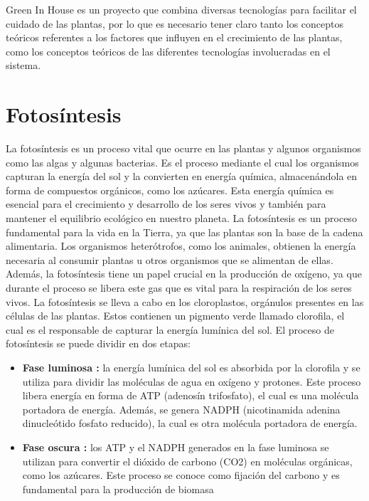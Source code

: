 
Green In House es un proyecto que combina diversas tecnologías para facilitar el cuidado de las plantas, por lo que es necesario tener claro tanto los conceptos teóricos referentes a los factores que influyen en el crecimiento de las plantas, como los conceptos teóricos de las diferentes tecnologías involucradas en el sistema.

\section{Fotosíntesis}
La fotosíntesis \cite{wiki:fotosíntesis} es un proceso vital que ocurre en las plantas y algunos organismos como las algas y algunas bacterias. Es el proceso mediante el cual los organismos capturan la energía del sol y la convierten en energía química, almacenándola en forma de compuestos orgánicos, como los azúcares. Esta energía química es esencial para el crecimiento y desarrollo de los seres vivos y también para mantener el equilibrio ecológico en nuestro planeta.
La fotosíntesis es un proceso fundamental para la vida en la Tierra, ya que las plantas son la base de la cadena alimentaria. Los organismos heterótrofos, como los animales, obtienen la energía necesaria al consumir plantas u otros organismos que se alimentan de ellas. Además, la fotosíntesis tiene un papel crucial en la producción de oxígeno, ya que durante el proceso se libera este gas que es vital para la respiración de los seres vivos.
La fotosíntesis se lleva a cabo en los cloroplastos, orgánulos presentes en las células de las plantas. Estos contienen un pigmento verde llamado clorofila, el cual es el responsable de capturar la energía lumínica del sol. El proceso de fotosíntesis se puede dividir en dos etapas: 
\begin{itemize}
    \item \textbf{Fase luminosa \cite{wiki:fase_luminosa}:} la energía lumínica del sol es absorbida por la clorofila y se utiliza para dividir las moléculas de agua en oxígeno y protones. Este proceso libera energía en forma de ATP (adenosín trifosfato), el cual es una molécula portadora de energía. Además, se genera NADPH (nicotinamida adenina dinucleótido fosfato reducido), la cual es otra molécula portadora de energía.
    \item \textbf{Fase oscura \cite{wiki:fase_oscura}:} los ATP y el NADPH generados en la fase luminosa se utilizan para convertir el dióxido de carbono (CO2) en moléculas orgánicas, como los azúcares. Este proceso se conoce como fijación del carbono y es fundamental para la producción de biomasa
\end{itemize}


